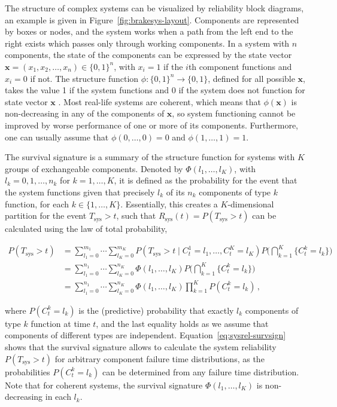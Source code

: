 \documentclass[Journal,letterpaper]{ascelike-new}
\renewcommand{\vec}[1]{{\bm#1}}
\newcommand{\Rsys}{R_\text{sys}}
\def\Rsys{R_\text{sys}}
\def\Tsys{T_\text{sys}}
\begin{document}
The structure of complex systems can be visualized by reliability block diagrams,
an example is given in Figure~\ref{fig:brakesys-layout}.
Components are represented by boxes or nodes,
and the system works when a path from the left end to the right exists
which passes only through working components.
In a system with $n$ components, the state of the components can be expressed by the state vector
$\vec{x} = (x_1,x_2,\ldots,x_n) \in \{0,1\}^n$, with $x_i=1$ if the $i$th component functions 
and $x_i=0$ if not.
The structure function $\phi : \{0,1\}^n \rightarrow \{0,1\}$, defined for all possible $\vec{x}$, takes 
the value 1 if the system functions and 0 if the system does not function for state vector $\vec{x}$
\cite{BP75}.
Most real-life systems are coherent,
which means that $\phi(\vec{x})$ is non-decreasing in any of the components of $\vec{x}$,
so system functioning cannot be improved by worse performance of one or more of its components.
Furthermore, one can usually assume that $\phi(0, \ldots, 0) = 0$ and $\phi(1, \ldots, 1) = 1$.

The survival signature \cite{2012:survsign} is a summary of the structure function
for systems with $K$ groups of exchangeable components.
Denoted by $\Phi(l_1,\ldots,l_K)$, with $l_k=0,1,\ldots,n_k$ for $k=1,\ldots,K$,
it is defined as the probability for the event that the system functions
given that precisely $l_k$ of its $n_k$ components of type $k$ function, for each $k\in \{1,\ldots,K\}$.
Essentially, this creates a $K$-dimensional partition for the event $\Tsys > t$,
such that $\Rsys(t) = P(\Tsys > t)$ can be calculated using the law of total probability,
\begin{linenomath*}
\begin{align}
P(\Tsys > t) &= \sum_{l_1=0}^{m_1} \cdots \sum_{l_K=0}^{m_K} P(\Tsys > t \mid C^1_t = l_1,\ldots, C^K_t = l_K)
                                                                                  P\Big( \bigcap_{k=1}^K \{ C^k_t = l_k\} \Big) \nonumber\\
             &= \sum_{l_1=0}^{n_1} \cdots \sum_{l_K=0}^{n_K} \Phi(l_1,\ldots,l_K) P\Big( \bigcap_{k=1}^K \{ C^k_t = l_k\} \Big) \nonumber\\
             &= \sum_{l_1=0}^{n_1} \cdots \sum_{l_K=0}^{n_K} \Phi(l_1,\ldots,l_K) \prod_{k=1}^K P(C^k_t = l_k)\,,
\label{eq:sysrel-survsign}
\end{align}
\end{linenomath*}
where $P(C^k_t = l_k)$ is the (predictive) probability that exactly $l_k$ components of type $k$ function at time $t$,
and the last equality holds as we assume that components of different types are independent.
Equation~\ref{eq:sysrel-survsign} shows that the survival signature allows to calculate the system reliability $P(\Tsys > t)$
for arbitrary component failure time distributions,
as the probabilities $P(C^k_t = l_k)$ can be determined from any failure time distribution.
Note that for coherent systems,
the survival signature $\Phi(l_1,\ldots,l_K)$ is non-decreasing in each $l_k$.
\end{document}
